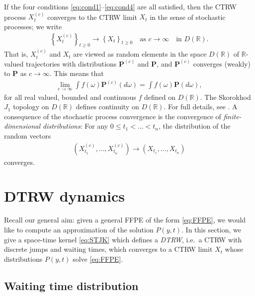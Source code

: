 \documentclass[a4paper,12pt]{elsarticle}
\numberwithin{equation}{section}
\theoremstyle{plain}
\theoremstyle{definition}
\theoremstyle{remark}
\numberwithin{equation}{section}
\newcommand{\spc}{\mathbb R}
\newcommand{\1}{\mathbf 1}
\newcommand{\pr}{\mathbf P}
\begin{document}
If the four conditions \eqref{eq:cond1}--\eqref{eq:cond4} are all satisfied, then the CTRW process $X^{(c)}_t$ converges to the CTRW limit $X_t$ in the sense of stochastic processes; we write
\begin{align} \label{eq:CTRW-J1}
\left \lbrace X^{(c)}_t \right\rbrace_{t \ge 0}
\longrightarrow \left \lbrace X_t \right\rbrace_{t \ge 0}
\quad \text{as } c \to \infty
\quad \text{in } D(\spc).
\end{align}
That is, $X^{(c)}_t$ and $X_t$ are viewed as random elements in the space $D(\spc)$ of $\spc$-valued trajectories with distributions $\pr^{(c)}$ and $\pr$, and $\pr^{(c)}$ converges (weakly) to $\pr$ as $c \to \infty$.
This means that
\begin{align}
\lim_{c \to \infty} \int f(\omega)\pr^{(c)}(d\omega)
= \int f(\omega)\pr(d\omega),
\end{align}
for all real valued, bounded and continuous $f$ defined on $D(\spc)$.
The Skorokhod $J_1$ topology on $D(\spc)$ defines continuity on $D(\spc)$. For full details, see \cite{Whitt2010}.  A consequence of the stochastic process convergence is the convergence of \emph{finite-dimensional distributions}: For any $0 \le t_1 < \ldots < t_n$, the distribution of the random vectors
\begin{align}
(X^{(c)}_{t_1}, \ldots, X^{(c)}_{t_n}) \to (X_{t_1}, \ldots, X_{t_n})
\end{align}
converges.



\section{DTRW dynamics}

Recall our general aim: given a general FFPE of the form \eqref{eq:FFPE}, we would like to compute an approximation of the solution $P(y,t)$.  In this section, we give a space-time kernel \eqref{eq:STJK} which defines a \emph{DTRW}, i.e.\ a CTRW with discrete jumps and waiting times, which converges to a CTRW limit $X_t$ whose distributions $P(y,t)$ solve \eqref{eq:FFPE}.


\subsection{Waiting time distribution}
\end{document}
